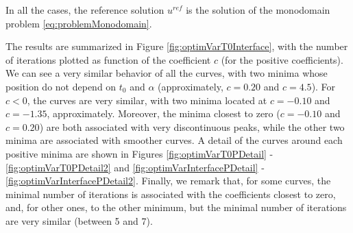 \indent In all the cases, the reference solution $u^{ref}$ is the solution of the monodomain problem \eqref{eq:problemMonodomain}.

\indent The results are summarized in Figure \ref{fig:optimVarT0Interface}, with the number of iterations plotted as function of the coefficient $c$ (for the positive coefficients). We can see a very similar behavior of all the curves, with two minima whose position do not depend on $t_0$ and $\alpha$ (approximately, $c = 0.20$ and $c=4.5$). For $c<0$, the curves are very similar, with two minima located at $c = -0.10$ and $c = -1.35$, approximately. Moreover, the minima closest to zero ($c=-0.10$ and $c = 0.20$) are both associated with very discontinuous peaks, while the other two minima are associated with smoother curves. A detail of the curves around each positive minima are shown in Figures \ref{fig:optimVarT0PDetail} - \ref{fig:optimVarT0PDetail2} and \ref{fig:optimVarInterfacePDetail} - \ref{fig:optimVarInterfacePDetail2}. Finally, we remark that, for some curves, the minimal number of iterations is associated with the coefficients closest to zero, and, for other ones, to the other minimum, but the minimal number of iterations are very similar (between 5 and 7).

